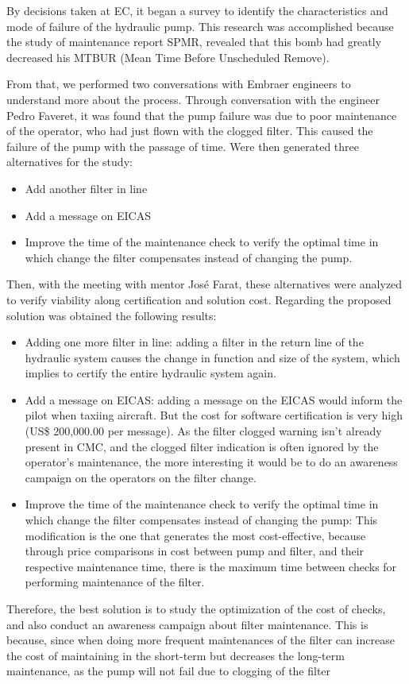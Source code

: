 By decisions taken at EC, it began a survey to identify the characteristics and mode of failure of the hydraulic pump. This research was accomplished because the study of maintenance report SPMR, revealed that this bomb had greatly decreased his MTBUR (Mean Time Before Unscheduled Remove).

From that, we performed two conversations with Embraer engineers to understand more about the process. Through conversation with the engineer Pedro Faveret, it was found that the pump failure was due to poor maintenance of the operator, who had just flown with the clogged filter. This caused the failure of the pump with the passage of time.
Were then generated three alternatives for the study:

\begin{itemize}
    \item Add another filter in line
    \item Add a message on EICAS
    \item Improve the time of the maintenance check to verify the optimal time in which change the filter compensates instead of changing the pump.
\end{itemize}

Then, with the meeting with mentor Jos\'e Farat, these alternatives were analyzed to verify viability along certification and solution cost.
Regarding the proposed solution was obtained the following results:

\begin{itemize}
    \item Adding one more filter in line: adding a filter in the return line of the hydraulic system causes the change in function and size of the system, which implies to certify the entire hydraulic system again.
    \item Add a message on EICAS: adding a message on the EICAS would inform the pilot when taxiing aircraft. But the cost for software certification is very high (US\$ 200,000.00 per message). As the filter clogged warning isn't already present in CMC, and the clogged filter indication is often ignored by the operator's maintenance, the more interesting it would be to do an awareness campaign on the operators on the filter change.
    \item Improve the time of the maintenance check to verify the optimal time in which change the filter compensates instead of changing the pump: This modification is the one that generates the most cost-effective, because through price comparisons in cost between pump and filter, and their respective maintenance time, there is the maximum time between checks for performing maintenance of the filter.
\end{itemize}

Therefore, the best solution is to study the optimization of the cost of checks, and also conduct an awareness campaign about filter maintenance. This is because, since when doing more frequent maintenances of the filter can increase the cost of maintaining in the short-term but decreases the long-term maintenance, as the pump will not fail due to clogging of the filter
